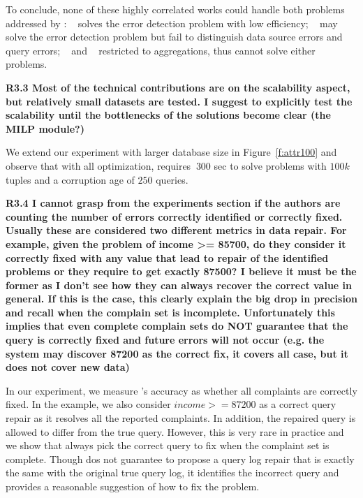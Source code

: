 To conclude, none of these highly correlated works could handle both problems addressed by \sys: ~\cite{meliou2011tracing} solves the error detection problem with low efficiency; ~\cite{chalamalla2014} may solve the error detection problem but fail to distinguish data source errors and query errors; ~\cite{Wu13} and ~\cite{roy2014formal} restricted to aggregations, thus cannot solve either problems.

\noindent \textbf{R3.3 Most of the technical contributions are on the scalability aspect, but relatively small datasets are tested. I suggest to explicitly test the scalability until the bottlenecks of the solutions become clear (the MILP module?)}

We extend our experiment with larger database size in Figure~\ref{f:attr100} and observe that with all optimization, \sys requires $~300$ sec to solve problems with $100k$ tuples and a corruption age of $250$ queries. 

\noindent \textbf{R3.4 I cannot grasp from the experiments section if the authors are counting the number of errors correctly identified or correctly fixed. Usually these are considered two different metrics in data repair. For example, given the problem of income >= 85700, do they consider it correctly fixed with any value that lead to repair of the identified problems or they require to get exactly 87500? 
I believe it must be the former as I don't see how they can always recover the correct value in general. If this is the case, this clearly explain the big drop in precision and recall when the complain set is incomplete. Unfortunately this implies that even complete complain sets do NOT guarantee that the query is correctly fixed and future errors will not occur (e.g. the system may discover 87200 as the correct fix, it covers all case, but it does not cover new data)}

In our experiment, we measure \sys's accuracy as whether all complaints are correctly fixed. In the example, we also consider $income >= 87200$ as a correct query repair as it resolves all the reported complaints. In addition, the repaired query is allowed to differ from the true query. However, this is very rare in practice and we show that \sys always pick the correct query to fix when the complaint set is complete. Though \sys dos not guarantee to propose a query log repair that is exactly the same with the original true query log, it identifies the incorrect query and provides a reasonable suggestion of how to fix the problem. 

